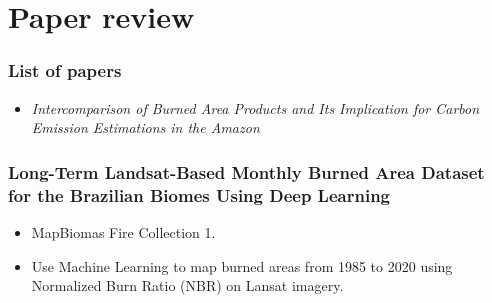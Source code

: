 \documentclass{beamer}
\begin{document}
\section{Paper review}

\begin{frame}
    \frametitle{List of papers}
    \begin{itemize}
        \item \textit{Intercomparison of Burned Area Products and Its 
            Implication for Carbon Emission Estimations in the Amazon}
    \end{itemize}
\end{frame}



\begin{frame}[t, allowframebreaks]
    \frametitle{Long-Term Landsat-Based Monthly Burned Area Dataset for 
            the Brazilian Biomes Using Deep Learning~\cite{alencar2022}}
    \begin{itemize}
        \item MapBiomas Fire Collection 1.
        \item Use Machine Learning to map burned areas from 1985 to 2020 using
            Normalized Burn Ratio (NBR) on Lansat imagery.
    \end{itemize}
\end{frame}
\end{document}
